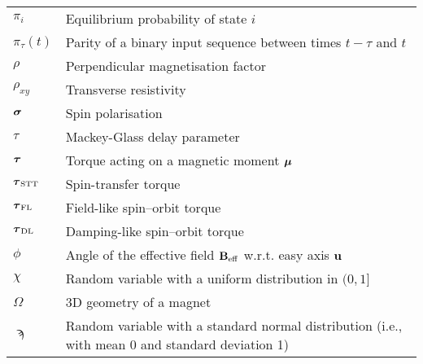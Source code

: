 \begin{longtable}[l]{p{50pt} p{295pt}}
	$\pi_i$ & Equilibrium probability of state $i$ \\
	$\pi_\tau(t)$ & Parity of a binary input sequence between times $t-\tau$ and $t$\vspace{\whiteline}\\

	$\rho$ & Perpendicular magnetisation factor \\
	$\rho_{xy}$ & Transverse resistivity\vspace{\whiteline}\\
	
	$\boldsymbol{\mathbf{\sigma}}$ & Spin polarisation\vspace{\whiteline}\\

	$\tau$ & Mackey-Glass delay parameter \\
	$\boldsymbol{\mathbf{\tau}}$ & Torque acting on a magnetic moment $\boldsymbol{\mathbf{\mu}}$ \\
	$\boldsymbol{\mathbf{\tau}}_\mathrm{STT}$ & Spin-transfer torque \\
	$\boldsymbol{\mathbf{\tau}}_\mathrm{FL}$ & Field-like spin--orbit torque \\
	$\boldsymbol{\mathbf{\tau}}_\mathrm{DL}$ & Damping-like spin--orbit torque\vspace{\whiteline}\\

	$\phi$ & Angle of the effective field $\boldsymbol{\mathbf{B}}_\mathrm{eff}$ w.r.t. easy axis $\boldsymbol{\mathbf{u}}$\vspace{\whiteline}\\

	$\chi$ & Random variable with a uniform distribution in $(0, 1]$\vspace{\whiteline}\\
	
	$\Omega$ & 3D geometry of a magnet\vspace{\whiteline}\\
	
	$\sampi$ & Random variable with a standard normal distribution (i.e., with mean 0 and standard deviation 1) \\
\end{longtable}
